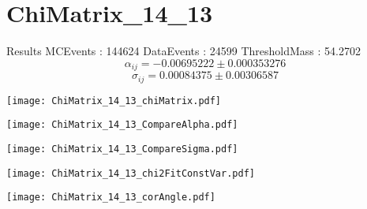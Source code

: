\documentclass[a4paper,12pt]{article}
\begin{document}
\section{ChiMatrix\_14\_13}
\begin{minipage}{0.49\linewidth} Results \newline
MCEvents : 144624\newline
DataEvents : 24599 \newline
ThresholdMass : 54.2702\\
$$\alpha_{ij} = -0.00695222\pm 0.000353276$$
$$\sigma_{ij} = 0.00084375\pm 0.00306587$$
\end{minipage}\hfill
\begin{minipage}{0.49\linewidth} 
\texttt{[image: ChiMatrix\_14\_13\_chiMatrix.pdf]}\\
\end{minipage}
\hfill
\begin{minipage}{0.49\linewidth} 
\texttt{[image: ChiMatrix\_14\_13\_CompareAlpha.pdf]}\\
\end{minipage}
\hfill
\begin{minipage}{0.49\linewidth} 
\texttt{[image: ChiMatrix\_14\_13\_CompareSigma.pdf]}\\
\end{minipage}
\begin{minipage}{0.49\linewidth} 
\texttt{[image: ChiMatrix\_14\_13\_chi2FitConstVar.pdf]}\\
\end{minipage}
\hfill
\begin{minipage}{0.49\linewidth} 
\texttt{[image: ChiMatrix\_14\_13\_corAngle.pdf]}\\
\end{minipage}
\end{document}
